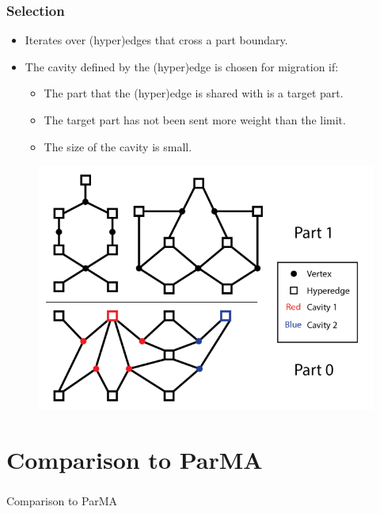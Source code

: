 \documentclass{beamer}
\begin{document}
\begin{frame}
  \frametitle{Selection}
  \begin{minipage}{.5\textwidth}
    \begin{itemize}
    \item Iterates over (hyper)edges that cross a part boundary.
      
    \item The cavity defined by the (hyper)edge is chosen for migration if:
      \begin{itemize}
      \item The part that the (hyper)edge is shared with is a target part.
      \item The target part has not been sent more weight than the limit.
      \item The size of the cavity is small.
      \end{itemize}
    \end{itemize}
  \end{minipage}
  \begin{minipage}{.45\textwidth}

    \begin{figure}
      \centering
      \includegraphics[width=\textwidth]{figures/PartBoundary.png}
    \end{figure}
  \end{minipage}
\end{frame}

\section{Comparison to ParMA}
\begin{frame}
  \frametitle{}
  \center \huge{Comparison to ParMA}
\end{frame}
\end{document}
